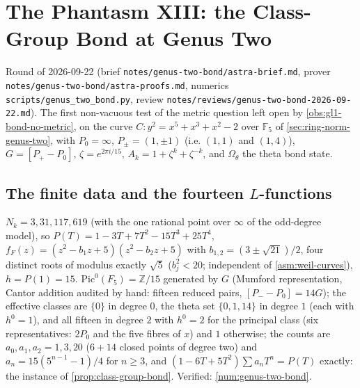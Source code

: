\section{The Phantasm XIII: the Class-Group Bond at Genus Two}
\label{sec:genus-two-bond}

Round of 2026-09-22 (brief \texttt{notes/genus-two-bond/astra-brief.md}, prover \texttt{notes/genus-two-bond/astra-proofs.md},
numerics \texttt{scripts/genus\_two\_bond.py}, review \texttt{notes/reviews/genus-two-bond-2026-09-22.md}). The first
non-vacuous test of the metric question left open by \cref{obs:gl1-bond-no-metric}, on the curve $C: y^2 = x^5+x^3+x^2-2$
over $\mathbb F_5$ of \cref{sec:ring-norm-genus-two}, with $P_0 = \infty$, $P_\pm = (1,\pm1)$ (i.e. $(1,1)$ and $(1,4)$),
$G = [P_+-P_0]$, $\zeta = e^{2\pi i/15}$, $A_k = 1+\zeta^k+\zeta^{-k}$, and $\Omega_\theta$ the theta bond state. %

\subsection{The finite data and the fourteen $L$-functions}

\begin{proposition}
\label{prop:genus-two-class-bond-data}
$N_k = 3,31,117,619$ (with the one rational point over $\infty$ of the odd-degree model), so $P(T) = 1-3T+7T^2-15T^3+25T^4$,
$f_F(z) = (z^2-b_1z+5)(z^2-b_2z+5)$ with $b_{1,2} = (3\pm\sqrt{21})/2$, four distinct roots of modulus exactly $\sqrt5$
($b_j^2<20$; independent of \cref{asm:weil-curves}), $h = P(1) = 15$. $\mathrm{Pic}^0(F_5) = \mathbb Z/15$ generated by $G$ (Mumford
representation, Cantor addition audited by hand: fifteen reduced pairs, $[P_--P_0] = 14G$); the effective classes are
$\{0\}$ in degree $0$, the theta set $\{0,1,14\}$ in degree $1$ (each with $h^0 = 1$), and all fifteen in degree $2$ with
$h^0 = 2$ for the principal class (six representatives: $2P_0$ and the five fibres of $x$) and $1$ otherwise; the counts are
$a_0,a_1,a_2 = 1,3,20$ ($6+14$ closed points of degree two) and $a_n = 15(5^{n-1}-1)/4$ for $n\ge3$, and
$(1-6T+5T^2)\sum a_nT^n = P(T)$ exactly: the instance of \cref{prop:class-group-bond}. Verified: \cref{num:genus-two-bond}.
\end{proposition}

